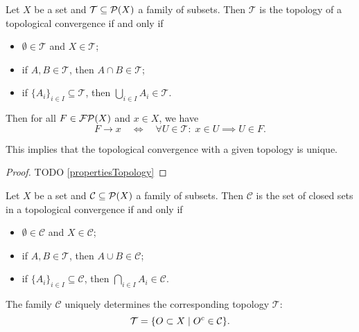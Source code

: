 \begin{proposition} \label{specifyingTopology}
Let $X$ be a set and $\mathcal{T}\subseteq \operatorname{\mathcal{P}}(X)$ a family of subsets. Then $\mathcal{T}$ is the topology of a topological convergence \textup{if and only if}
\begin{itemize}
\item $\emptyset\in \mathcal{T}$ and $X\in \mathcal{T}$;
\item if $A,B\in \mathcal{T}$, then $A\cap B\in \mathcal{T}$;
\item if $\{A_i\}_{i\in I}\subseteq \mathcal{T}$, then $\bigcup_{i\in I}A_i \in \mathcal{T}$.
\end{itemize}
Then for all $F\in\operatorname{\mathcal{FP}}(X)$ and $x\in X$, we have
\[ F\to x \quad\iff\quad \forall U\in \mathcal{T}: \; x\in U \implies U\in F. \]
\end{proposition}
This implies that the topological convergence with a given topology is unique.
\begin{proof}
TODO \ref{propertiesTopology}
\end{proof}
\begin{corollary}
Let $X$ be a set and $\mathcal{C}\subseteq \operatorname{\mathcal{P}}(X)$ a family of subsets. Then $\mathcal{C}$ is the set of closed sets in a topological convergence \textup{if and only if}
\begin{itemize}
\item $\emptyset\in \mathcal{C}$ and $X\in \mathcal{C}$;
\item if $A,B\in \mathcal{T}$, then $A\cup B\in \mathcal{C}$;
\item if $\{A_i\}_{i\in I}\subseteq \mathcal{C}$, then $\bigcap_{i\in I}A_i \in \mathcal{C}$.
\end{itemize}
The family $\mathcal{C}$ uniquely determines the corresponding topology $\mathcal{T}$:
\[ \mathcal{T} = \setbuilder{O\subset X}{O^c\in\mathcal{C}}. \]
\end{corollary}

